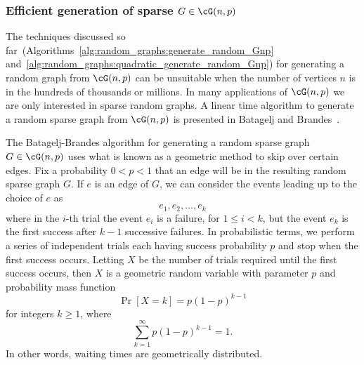
\subsubsection{Efficient generation of sparse $G \in \cG(n,p)$}

The techniques discussed so
far~(Algorithms~\ref{alg:random_graphs:generate_random_Gnp}
and~\ref{alg:random_graphs:quadratic_generate_random_Gnp}) for
generating a random graph from $\cG(n,p)$ can be unsuitable when the
number of vertices $n$ is in the hundreds of thousands or millions. In
many applications of $\cG(n,p)$ we are only interested in
sparse random graphs. A linear time algorithm to
generate a random sparse graph from $\cG(n,p)$ is presented in
Batagelj and
Brandes~\cite{BatageljBrandes2005}.

The Batagelj-Brandes algorithm for
generating a random sparse graph $G \in \cG(n,p)$ uses what is known as
a geometric method to skip over certain edges. Fix a probability
$0 < p < 1$ that an edge will be in the resulting random sparse graph
$G$. If $e$ is an edge of $G$, we can consider the events leading up
to the choice of $e$ as
\[
e_1, e_2, \dots, e_k
\]
where in the $i$-th trial the event $e_i$ is a failure, for
$1 \leq i < k$, but the event $e_k$ is the first success after
$k - 1$ successive failures. In probabilistic terms, we perform a
series of independent trials each having success probability $p$ and
stop when the first success occurs. Letting $X$ be the number of
trials required until the first success occurs, then $X$ is a
geometric random variable with parameter $p$ and probability mass
function
\begin{equation}
\label{eqn:random_graphs:probability_mass_function_geometric_distribution}
\Pr[X = k]
=
p (1 - p)^{k - 1}
\end{equation}
for integers $k \geq 1$, where
\[
\sum_{k=1}^\infty p (1 - p)^{k - 1}
=
1.
\]
In other words, waiting times are
geometrically distributed.

